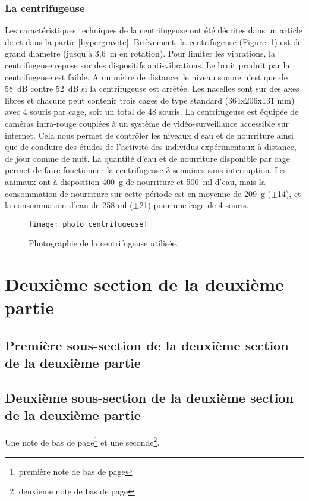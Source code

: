 \subsubsection{La centrifugeuse}
Les caractéristiques techniques de la centrifugeuse ont été décrites dans un article de \cite{jamon_ground-based_2008} et dans la partie \ref{hypergravite}. Brièvement, la centrifugeuse (Figure~\ref{photo_centrifugeuse}) est de grand diamètre (jusqu'à 3,6~m en rotation). Pour limiter les vibrations, la centrifugeuse repose sur des dispositifs anti-vibrations. Le bruit produit par la centrifugeuse est faible. A un mètre de distance, le niveau sonore n'est que de 58~dB contre 52~dB si la centrifugeuse est arrêtée. Les nacelles sont sur des axes libres et chacune peut contenir trois cages de type standard (364x206x131 mm) avec 4 souris par cage, soit un total de 48 souris. La centrifugeuse est équipée de caméras infra-rouge couplées à un système de vidéo-surveillance accessible sur internet. Cela nous permet de contrôler les niveaux d'eau et de nourriture ainsi que de conduire des études de l'activité des individus expérimentaux à distance, de jour comme de nuit. La quantité d'eau et de nourriture disponible par cage permet de faire fonctionner la centrifugeuse 3 semaines sans interruption. Les animaux ont à disposition 400~g de nourriture et 500~ml d'eau, mais la consommation de nourriture sur cette période est en moyenne de 209~g ($\pm$14), et la consommation d'eau de 258 ml ($\pm$21) pour une cage de 4 souris. 
\begin{figure}[h!tbp]
\vspace{0.5cm}
\setcapindent{2em}
  \centering
  \texttt{[image: photo\_centrifugeuse]}
  \caption[Photographie de la centrifugeuse]{Photographie de la centrifugeuse utilisée.}
  \label{photo_centrifugeuse}
\end{figure}
\lipsum[1]
\section{Deuxième section de la deuxième partie}
\lipsum[2]
\subsection{Première sous-section de la deuxième section de la deuxième partie}
\lipsum[4]
\subsection[Sous-sous-sous-partie 2]{Deuxième sous-section de la deuxième section de la deuxième partie} %
\lipsum[4]Une note de bas de page\footnote{première note de bas de page} et une seconde\footnote{deuxième note de bas de page}.
